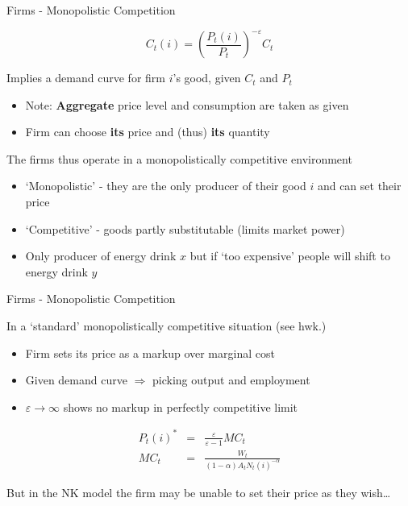 \documentclass{beamer}
\begin{document}

	
\begin{frame}{Firms - Monopolistic Competition}

\[
C_{t}(i) = \left( \frac{P_{t}(i)}{P_{t}} \right)^{-\varepsilon} C_{t}
\]

Implies a demand curve for firm $i$'s good, given $C_{t}$ and $P_{t}$
\begin{itemize}
\item	Note: \textbf{Aggregate} price level and consumption are taken as given
\item	Firm can choose \textbf{its} price and (thus) \textbf{its} quantity
\end{itemize}

\vspace{2mm}
The firms thus operate in a monopolistically competitive environment
\begin{itemize}
\item	`Monopolistic' - they are the only producer of their good $i$ and can set their price
\item	`Competitive' - goods partly substitutable (limits market power)
\item	Only producer of energy drink $x$ but if `too expensive' people will shift to energy drink $y$
\end{itemize}


\end{frame}


	
\begin{frame}{Firms - Monopolistic Competition}

In a `standard' monopolistically competitive situation (see hwk.)
\begin{itemize}
\item	Firm sets its price as a markup over marginal cost
\item	Given demand curve $\Rightarrow$ picking output and employment
\item	$\varepsilon \rightarrow \infty$ shows no markup in perfectly competitive limit
\end{itemize}
\begin{eqnarray*}
P_{t}(i)^{*} &=& \frac{\varepsilon}{\varepsilon-1} MC_{t} \label{ref:flex_markup} \\
MC_{t}		&=& \frac{W_{t}}{\left( 1 - \alpha \right) A_{t} N_{t}(i)^{-\alpha}}
\end{eqnarray*}

\vspace{2mm}
But in the NK model the firm may be unable to set their price as they wish\ldots

\end{frame}
\end{document}
